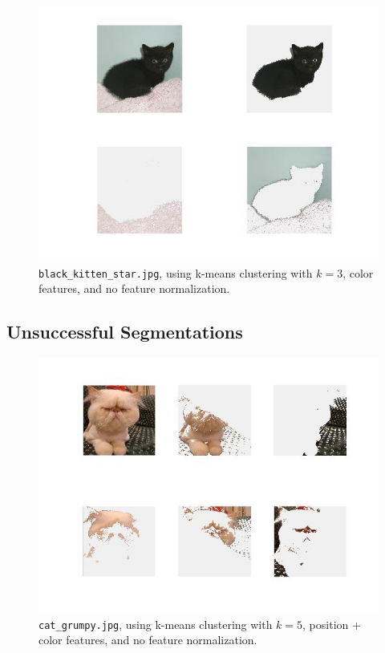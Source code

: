 \documentclass[12pt]{article}
\begin{document}
\begin{figure}[H]
	\centering
	\includegraphics[width=.95\textwidth]{succ3.jpg}
	\caption{\texttt{black\_kitten\_star.jpg}, using k-means clustering with $k = 3$, color features, and no feature normalization.}
\end{figure}

\subsection{Unsuccessful Segmentations}
\begin{figure}[H]
	\centering
	\includegraphics[width=.9\textwidth]{unsucc1.jpg}
	\caption{\texttt{cat\_grumpy.jpg}, using k-means clustering with $k = 5$, position + color features, and no feature normalization.}
\end{figure}
\end{document}
